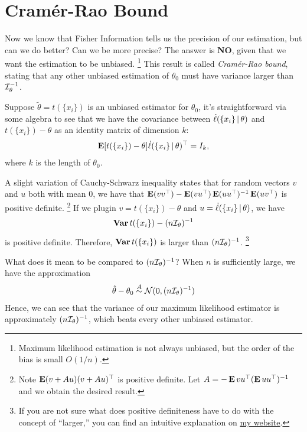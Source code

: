 \documentclass[a4paper]{article}
\begin{document}
\section{Cramér-Rao Bound}

Now we know that Fisher Information tells us the precision of our estimation,
but can we do better?
Can we be more precise?
The answer is \textbf{NO}, given that we want the estimation to be unbiased.
\footnote{
	Maximum likelihood estimation is not always unbiased,
	but the order of the bias is small $O(1/n)$.
}
This result is called \emph{Cramér-Rao bound},
stating that any other unbiased estimation of $\theta_0$ must have variance larger than $\mathcal{I}_{\theta}^{-1}$.

Suppose $\tilde\theta=t(\{x_i\})$ is an unbiased estimator for $\theta_0$,
it's straightforward via some algebra to see that
we have the covariance between $\dot\ell(\{x_i\}\,|\,\theta)$ and $t(\{x_i\})-\theta$ as an identity matrix of dimension $k$:
\begin{align*}
\operatorname{\text{\textrm{\upshape\textbf{E}}}} [t(\{x_i\})-\theta] \dot\ell(\{x_i\}\,|\,\theta)^{\top}
= I_k,
\end{align*}
where $k$ is the length of $\theta_0$.

A slight variation of Cauchy-Schwarz inequality states that
for random vectors $v$ and $u$ both with mean $0$, we have that
$\operatorname{\text{\textrm{\upshape\textbf{E}}}}(vv^{\top}) - \operatorname{\text{\textrm{\upshape\textbf{E}}}}(vu^{\top})\operatorname{\text{\textrm{\upshape\textbf{E}}}}(uu^{\top})^{-1}\operatorname{\text{\textrm{\upshape\textbf{E}}}}(uv^{\top})$
is positive definite. 
\footnote{
	Note $\operatorname{\text{\textrm{\upshape\textbf{E}}}}(v+Au)(v+Au)^{\top}$ is positive definite.
	Let $A=-\operatorname{\text{\textrm{\upshape\textbf{E}}}}{vu^{\top}}(\operatorname{\text{\textrm{\upshape\textbf{E}}}}{uu^{\top}})^{-1}$ and we obtain the desired result.
}
If we plugin $v=t(\{x_i\})-\theta$ and $u=\dot\ell(\{x_i\}\,|\,\theta)$,
we have
\begin{align*}
	\operatorname{\text{\textrm{\upshape\textbf{Var}}}} t(\{x_i\}) - (n\mathcal{I}_{\theta})^{-1}
\end{align*}
is positive definite.
Therefore, $\operatorname{\text{\textrm{\upshape\textbf{Var}}}}{t(\{x_i\})}$ is larger than $(n\mathcal{I}_{\theta})^{-1}$.
\footnote{
	If you are not sure what does positive definiteness have to do with the concept of ``larger,''
	you can find an intuitive explanation on \href{https://jessekelighine.com}{my website}.
}

What does it mean to be compared to $(n\mathcal{I}_\theta)^{-1}$?
When $n$ is sufficiently large, we have the approximation
\begin{align*}
	\hat\theta - \theta_0 \overset{A}{\sim} \mathcal{N}(0,(n\mathcal{I}_\theta)^{-1})
\end{align*}
Hence, we can see that the variance of our maximum likelihood estimator is approximately $(n\mathcal{I}_{\theta})^{-1}$,
which beats every other unbiased estimator.
\end{document}
